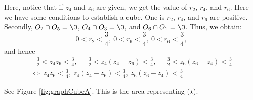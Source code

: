 \documentclass[suppldata, dvipdfmx]{interact}
\theoremstyle{plain}%
\theoremstyle{definition}
\theoremstyle{remark}
\newtheorem{remark}{Remark}
\theoremstyle{problemstyle}
\begin{document}
Here, notice that if $z_4$ and $z_6$ are given, we get the value of $r_2$, $r_4$, and $r_6$.  Here we have some conditions to establish a cube.  One is $r_2$, $r_4$, and $r_6$ are positive.  Secondly, $O_2\cap O_5=\O$, $O_4\cap O_3=\O$, and $O_6\cap O_1=\O$.  Thus, we obtain:
\[
0<r_2<\frac{3}{4},\ 0<r_6<\frac{3}{4},\ 0<r_6<\frac{3}{4},
\]
and hence
\begin{gather*}
-\frac{3}{2}<z_4z_6<\frac{3}{4},\ -\frac{3}{2}<z_4(z_4-z_6)<\frac{3}{4}, \ -\frac{3}{2}<z_6(z_6-z_4)<\frac{3}{4} \\
\Leftrightarrow\ z_4z_6<\frac{3}{4},\ z_4(z_4-z_6)<\frac{3}{4}, \ z_6(z_6-z_4)<\frac{3}{4} \tag{$\star$}
\end{gather*}

See Figure \ref{fig:graphCubeA}. This is the area representing ($\star$).



\end{document}

